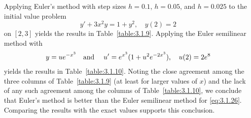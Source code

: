 \setcounter{example}{5}
\setcounter{equation}{25}
\begin{example}
  {\relax}\label{example:3.1.6} \rm Applying Euler's method with step sizes $h=0.1$, $h=0.05$,
  and $h=0.025$ to the initial value problem
  \begin{equation}
    \label{eq:3.1.26}y'+3x^{2}y=1+y^{2},\quad y(2)=2
  \end{equation}
  on $[2,3]$ yields the results in Table~\ref{table:3.1.9}. Applying the Euler semilinear method
  with
  \[
    y=ue^{-x^{3}}\mbox{\quad and \quad}u'=e^{x^{3}}(1+u^{2}e^{-2x^{3}}),\quad u(2)=2e^{8}
  \]
  yields the results in Table~\ref{table:3.1.10}. Noting the close agreement among the three columns
  of Table~\ref{table:3.1.9} (at least for larger values of $x$) and the lack of any such agreement
  among the columns of Table~\ref{table:3.1.10}, we conclude that Euler's method is better than the
  Euler semilinear method for \eqref{eq:3.1.26}. Comparing the results with the exact values
  supports this conclusion.
\end{example}
\setcounter{table}{8}
